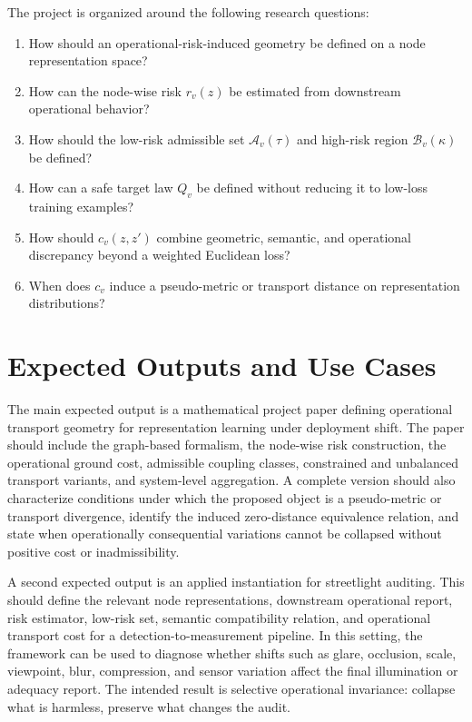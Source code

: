 \documentclass[10pt,twocolumn]{article}
\begin{document}
The project is organized around the following research questions:
\begin{enumerate}
    \item How should an operational-risk-induced geometry be defined on a node representation space?
    \item How can the node-wise risk $r_v(z)$ be estimated from downstream operational behavior?
    \item How should the low-risk admissible set $\mathcal{A}_v(\tau)$ and high-risk region $\mathcal{B}_v(\kappa)$ be defined?
    \item How can a safe target law $Q_v$ be defined without reducing it to low-loss training examples?
    \item How should $c_v(z,z')$ combine geometric, semantic, and operational discrepancy beyond a weighted Euclidean loss?
    \item When does $c_v$ induce a pseudo-metric or transport distance on representation distributions?
\end{enumerate}

\section{Expected Outputs and Use Cases}

The main expected output is a mathematical project paper defining operational transport geometry for representation learning under deployment shift. The paper should include the graph-based formalism, the node-wise risk construction, the operational ground cost, admissible coupling classes, constrained and unbalanced transport variants, and system-level aggregation. A complete version should also characterize conditions under which the proposed object is a pseudo-metric or transport divergence, identify the induced zero-distance equivalence relation, and state when operationally consequential variations cannot be collapsed without positive cost or inadmissibility.

A second expected output is an applied instantiation for streetlight auditing. This should define the relevant node representations, downstream operational report, risk estimator, low-risk set, semantic compatibility relation, and operational transport cost for a detection-to-measurement pipeline. In this setting, the framework can be used to diagnose whether shifts such as glare, occlusion, scale, viewpoint, blur, compression, and sensor variation affect the final illumination or adequacy report. The intended result is selective operational invariance: collapse what is harmless, preserve what changes the audit.
\end{document}
